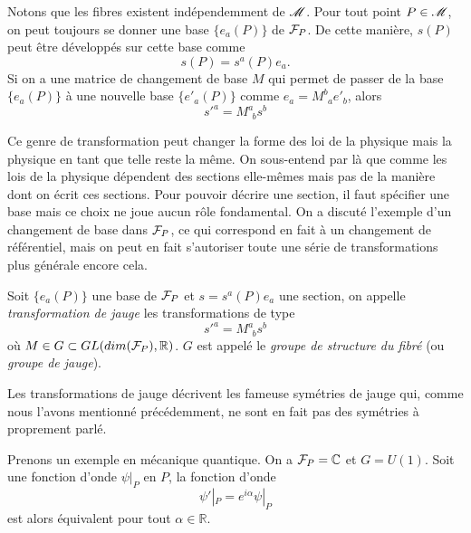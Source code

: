 \documentclass[a4paper,11pt]{report}
\begin{document}
                Notons que les fibres existent indépendemment de $\mathscr{M}$. Pour tout point $P\in\mathscr{M}$, on peut toujours se donner une base $\{e_a(P)\}$ de $\mathcal{F}_P$. De cette manière, $s(P)$ peut être développés sur cette base comme
                \begin{equation}
                    s(P) = s^a(P)e_a.
                \end{equation}
                Si on a une matrice de changement de base $M$ qui permet de passer de la base $\{e_a(P)\}$ à une nouvelle base $\{e'_a(P)\}$ comme $e_a = M^b_{~~a} e'_b$, alors
                \begin{equation}
                    s'^a = M^a_{~~b}s^b
                \end{equation}
                
                Ce genre de transformation peut changer la forme des loi de la physique mais la physique en tant que telle reste la même. On sous-entend par là que comme les lois de la physique dépendent des sections elle-mêmes mais pas de la manière dont on écrit ces sections. Pour pouvoir décrire une section, il faut spécifier une base mais ce choix ne joue aucun rôle fondamental. On a discuté l'exemple d'un changement de base dans $\mathcal{F}_P$, ce qui correspond en fait à un changement de référentiel, mais on peut en fait s'autoriser toute une série de transformations plus générale encore cela.
                
                \begin{definition}
                    Soit $\{e_a(P)\}$ une base de $\mathcal{F}_P$ et $s = s^a(P)e_a$ une section, on appelle \textit{transformation de jauge} les transformations de type
                    \begin{equation}
                    s'^a = M^a_{~~b}s^b
                    \end{equation}
                    où $M\in G\subset GL(dim(\mathcal{F}_P),\mathbb{R})$. $G$ est appelé le \textit{groupe de structure du fibré} (ou \textit{groupe de jauge}).
                \end{definition}
                
                Les transformations de jauge décrivent les fameuse symétries de jauge qui, comme nous l'avons mentionné précédemment, ne sont en fait pas des symétries à proprement parlé.
                
                \begin{exmp}
                    Prenons un exemple en mécanique quantique. On a $\mathcal{F}_P = \mathbb{C}$ et $G = U(1)$. Soit une fonction d'onde $\psi|_P$ en $P$, la fonction d'onde
                    \begin{equation}
                        \psi'|_P = e^{i\alpha}\psi|_P
                    \end{equation}
                    est alors équivalent pour tout $\alpha\in\mathbb{R}$.
                \end{exmp}
                
\end{document}
